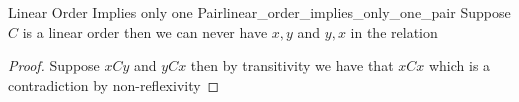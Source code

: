 \begin{proposition}{Linear Order Implies only one Pair}{linear_order_implies_only_one_pair}
Suppose \( C \) is a linear order then we can never have \( x, y \) and \( y, x
\) in the relation
\end{proposition}
\begin{proof}
    Suppose \( x C y \) and \( y C x \) then by transitivity we have that \( x C
    x\) which is a contradiction by non-reflexivity
\end{proof}
